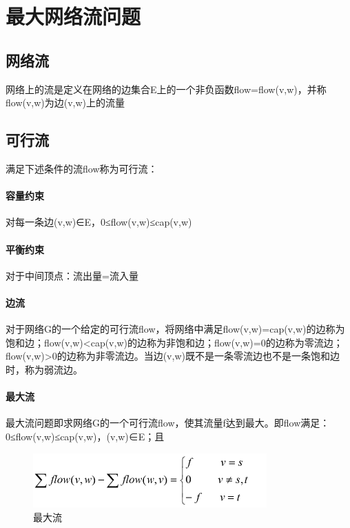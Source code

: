 \documentclass[UTF8]{ctexart}
\begin{document}
    \section{最大网络流问题}
    \subsection{网络流}
    网络上的流是定义在网络的边集合E上的一个非负函数flow={flow(v,w)}，并称flow(v,w)为边(v,w)上的流量

    \subsection{可行流}
    满足下述条件的流flow称为可行流：

    \paragraph{容量约束}   对每一条边(v,w)∈E，0≤flow(v,w)≤cap(v,w)

    \paragraph{平衡约束}   对于中间顶点：流出量=流入量

    \paragraph{边流}    对于网络G的一个给定的可行流flow，将网络中满足flow(v,w)=cap(v,w)的边称为饱和边；flow(v,w)<cap(v,w)的边称为非饱和边；flow(v,w)=0的边称为零流边；flow(v,w)>0的边称为非零流边。当边(v,w)既不是一条零流边也不是一条饱和边时，称为弱流边。

    \paragraph{最大流}
    最大流问题即求网络G的一个可行流flow，使其流量f达到最大。即flow满足：0≤flow(v,w)≤cap(v,w)，(v,w)∈E；且

    \begin{figure}[!htb]
      \centering
      \includegraphics[width=0.8\textwidth]{../img/8.1.png}
      \caption{最大流}\label{最大流}
    \end{figure}
\end{document}
